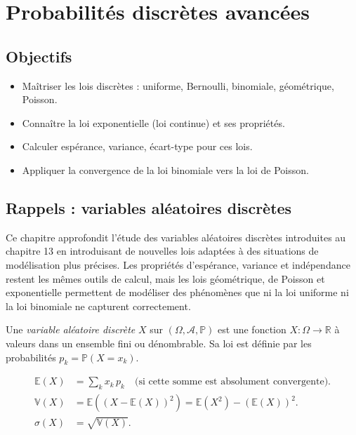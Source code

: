 \documentclass[11pt,a4paper,twoside]{book}
\newcommand{\R}{\mathbb{R}}
\begin{document}
\chapter{Probabilités discrètes avancées}

\section*{Objectifs}
\begin{itemize}[leftmargin=1.5em]
  \item Maîtriser les lois discrètes : uniforme, Bernoulli, binomiale, géométrique, Poisson.
  \item Connaître la loi exponentielle (loi continue) et ses propriétés.
  \item Calculer espérance, variance, écart-type pour ces lois.
  \item Appliquer la convergence de la loi binomiale vers la loi de Poisson.
\end{itemize}

\section{Rappels : variables aléatoires discrètes}

Ce chapitre approfondit l'étude des variables aléatoires discrètes introduites au chapitre 13 en introduisant de nouvelles lois adaptées à des situations de modélisation plus précises. Les propriétés d'espérance, variance et indépendance restent les mêmes outils de calcul, mais les lois géométrique, de Poisson et exponentielle permettent de modéliser des phénomènes que ni la loi uniforme ni la loi binomiale ne capturent correctement.

\begin{definitionbox}
Une \emph{variable aléatoire discrète} $X$ sur $(\Omega, \mathcal{A}, \mathbb{P})$ est une fonction
$X : \Omega \to \R$ à valeurs dans un ensemble fini ou dénombrable.
Sa loi est définie par les probabilités $p_k = \mathbb{P}(X = x_k)$.
\end{definitionbox}

\begin{definitionbox}
\begin{align*}
  \mathbb{E}(X) &= \sum_k x_k \, p_k \quad \text{(si cette somme est absolument convergente)}.\\
  \mathbb{V}(X) &= \mathbb{E}((X - \mathbb{E}(X))^2) = \mathbb{E}(X^2) - (\mathbb{E}(X))^2.\\
  \sigma(X) &= \sqrt{\mathbb{V}(X)}.
\end{align*}
\end{definitionbox}
\end{document}
